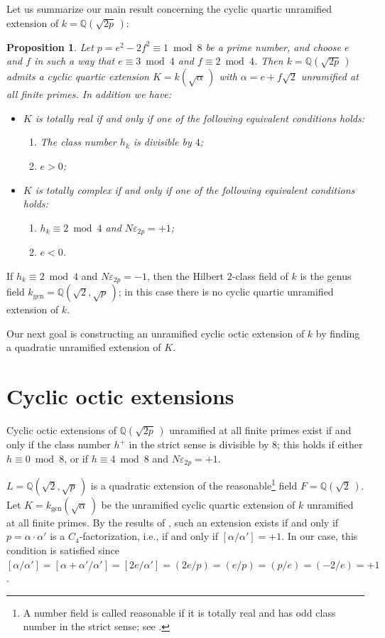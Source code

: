 \documentclass{amsart}
\newtheorem{prop}[lem]{Proposition}
\newcommand{\Q}{{\mathbb Q}}
\newcommand{\gen}{{\operatorname{gen}}}
\newcommand{\eps}{\varepsilon}
\begin{document}
Let us summarize our main result concerning the cyclic quartic unramified
extension of $k = \Q(\sqrt{2p}\,)$:

\begin{prop}
  Let $p = e^2 - 2f^2 \equiv 1 \bmod 8$ be a prime number, and choose
  $e$ and $f$ in such a way that $e \equiv 3 \bmod 4$ and
  $f \equiv 2 \bmod 4$. Then $k = \Q(\sqrt{2p}\,)$ admits a cyclic
  quartic extension $K = k(\sqrt{\alpha}\,)$ with $\alpha = e + f\sqrt{2}$
  unramified at all finite primes. In addition we have:
  \begin{itemize}
  \item $K$ is totally real if and only if one of the following equivalent
    conditions holds:
    \begin{enumerate}
    \item The class number $h_k$ is divisible by $4$;
    \item $e > 0$;
    \end{enumerate}
  \item $K$ is totally complex if and only if one of the following equivalent
    conditions holds:
    \begin{enumerate}
    \item $h_k \equiv 2 \bmod 4$ and $N\eps_{2p} = +1$;
    \item $e < 0$.
    \end{enumerate}
  \end{itemize}  
\end{prop}

If $h_k \equiv 2 \bmod 4$ and $N\eps_{2p} = -1$, then the Hilbert
$2$-class field of $k$ is the genus field $k_\gen = \Q(\sqrt{2}, \sqrt{p}\,)$;
in this case there is no cyclic quartic unramified extension of $k$.

Our next goal is constructing an unramified cyclic octic extension of $k$ by
finding a quadratic unramified extension of $K$.

\section{Cyclic octic extensions}

Cyclic octic extensions of $\Q(\sqrt{2p}\,)$ unramified at all finite
primes exist if and only if the class number $h^+$ in the strict sense is
divisible by $8$; this holds if either $h \equiv 0 \bmod 8$, or if
$h \equiv 4 \bmod 8$ and $N\eps_{2p} = +1$.

$L = \Q(\sqrt{2},\sqrt{p}\,)$ is a quadratic extension of the
reasonable\footnote{A number field is called reasonable if it is totally
  real and has odd class number in the strict sense; see \cite{LTh,LemD}.}
field $F = \Q(\sqrt{2}\,)$. Let $K = k_\gen(\sqrt{\alpha}\,)$ be the unramified
cyclic quartic extension of $k$ unramified at all finite primes. 
By the results of \cite{LTh}, such an extension exists if and only if
$p = \alpha \cdot \alpha'$ is a $C_4$-factorization, i.e., if and only
if $[\alpha/\alpha'] = +1$.
In our case, this condition is satisfied since 
$[\alpha/\alpha'] = [\alpha + \alpha'/\alpha'] = [2e/\alpha'] =
 (2e/p) = (e/p) = (p/e) = (-2/e) = +1$.
\end{document}
